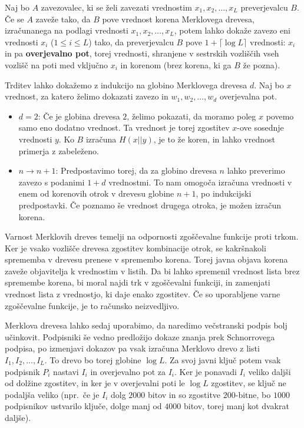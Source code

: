 \begin{trditev}
\label{trd:overjevalna_pot}
    Naj bo $A$ zavezovalec, ki se želi zavezati vrednostim $x_1, x_2, \dots, x_L$ preverjevalcu $B$. Če
    se $A$ zaveže tako, da $B$ pove vrednost korena Merklovega drevesa, izračunanega na podlagi
    vrednosti $x_1, x_2, \dots, x_L$, potem lahko dokaže zavezo eni vrednosti $x_i$ ($1 \le i \le L$)
    tako, da preverjevalcu $B$ pove $1 + \lceil \log L \rceil$ vrednosti: $x_i$ in pa \textbf{overjevalno
    pot}, torej vrednosti, shranjene v sestrskih vozliščih vseh vozlišč na poti med vključno $x_i$ in
    korenom (brez korena, ki ga $B$ že pozna).
\end{trditev}

\begin{dokaz}
    Trditev lahko dokažemo z indukcijo na globino Merklovega drevesa $d$. Naj bo $x$ vrednost, za katero
    želimo dokazati zavezo in $w_1, w_2, \dots, w_d$ overjevalna pot.
    \begin{itemize}
        \item $d = 2$: Če je globina drevesa $2$, želimo pokazati, da moramo poleg $x$ povemo samo eno
            dodatno vrednost. Ta vrednost je torej zgostitev $x$-ove sosednje vrednosti $y$. Ko $B$ izračuna
            $H(x || y)$, je to že koren, in lahko vrednost primerja z zabeleženo.
        \item $n \rightarrow n + 1$: Predpostavimo torej, da za globino drevesa $n$ lahko preverimo zavezo s
            podanimi $1 + d$ vrednostmi. To nam omogoča izračuna vrednosti v enem od korenovih otrok v
            drevesu globine $n + 1$, po indukcijski predpostavki. Če poznamo še vrednost drugega otroka, je
            možen izračun korena.
    \end{itemize}
\end{dokaz}

Varnost Merklovih dreves temelji na odpornosti zgoščevalne funkcije proti trkom. Ker je vsako vozlišče
drevesa zgostitev kombinacije otrok, se kakršnakoli sprememba v drevesu prenese v spremembo korena.
Torej javna objava korena zaveže objavitelja k vrednostim v listih. Da bi lahko spremenil vrednost
lista brez spremembe korena, bi moral najdi trk v zgoščevalni funkciji, in zamenjati vrednost lista
z vrednostjo, ki daje enako zgostitev. Če so uporabljene varne zgoščevalne funkcije, je to računsko
neizvedljivo.

Merklova drevesa lahko sedaj uporabimo, da naredimo večstranski podpis bolj učinkovit. Podpisniki
še vedno predložijo dokaze znanja prek Schnorrovega podpisa, po izmenjavi dokazov pa vsak izračuna
Merklovo drevo z listi $I_1, I_2, \dots, I_L$. To drevo bo torej globine $\log L$. Za svoj javni
ključ potem vsak podpisnik $P_i$ nastavi $I_i$ in overjevalno pot za $I_i$. Ker je ponavadi $I_i$
veliko daljši od dolžine zgostitev, in ker je v overjevalni poti le $\log L$ zgostitev, se ključ
ne podaljša veliko (npr.\, če je $I_i$ dolg $2000$ bitov in so zgostitve $200$-bitne, bo $1000$
podpisnikov ustvarilo ključe, dolge manj od $4000$ bitov, torej manj kot dvakrat daljše).

